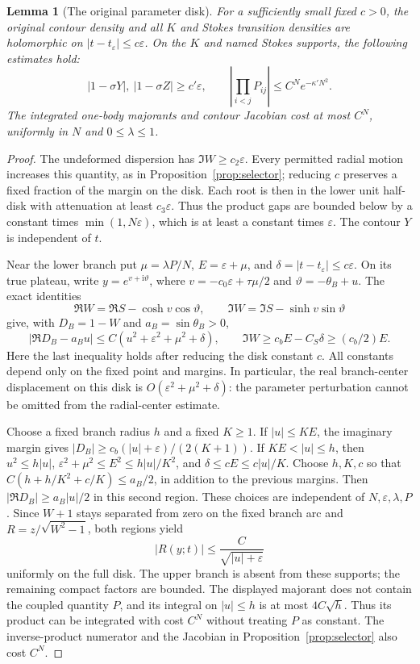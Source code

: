 \documentclass[11pt]{article}
\numberwithin{equation}{section}
\newtheorem{lemma}[theorem]{Lemma}
\theoremstyle{definition}
\newcommand{\ii}{\mathrm i}
\newcommand{\eps}{\varepsilon}
\newcommand{\se}{t_\varepsilon}
\begin{document}
\begin{lemma}[The original parameter disk]\label{lem:originaldisk}
For a sufficiently small fixed \(c>0\), the original contour
density and all \(K\) and Stokes transition densities are holomorphic
on \(|t-t_\eps|\le c\eps\). On the \(K\) and named Stokes
supports, the following estimates hold:
\[
 |1-\sigma Y|,\ |1-\sigma Z|\ge c'\eps,\qquad
 \left|\prod_{i<j}P_{ij}\right|\le C^Ne^{-\kappa' N^2}.
\]
The integrated one-body majorants and contour Jacobian cost
at most \(C^N\), uniformly in \(N\) and \(0\le\lambda\le1\).
\end{lemma}
\begin{proof}
The undeformed dispersion has \(\Im W\ge c_2\eps\).
Every permitted radial motion increases this quantity, as in
Proposition~\ref{prop:selector}; reducing \(c\) preserves a
fixed fraction of the margin on the disk. Each root is then
in the lower unit half-disk with attenuation at least \(c_3\eps\).
Thus the product gaps are bounded below by a constant times
\(\min(1,N\eps)\), which is at least a constant times \(\eps\).
The contour \(Y\) is independent of \(t\).

Near the lower branch put \(\mu=\lambda P/N\),
\(E=\eps+\mu\), and \(\delta=|t-\se|\le c\eps\).
On its true plateau, write
\(y=e^{v+\ii\vartheta}\), where
\(v=-c_0\eps+\tau \mu/2\) and \(\vartheta=-\theta_B+u\).
The exact identities
\[
 \Re W=\Re S-\cosh v\cos\vartheta,\qquad
 \Im W=\Im S-\sinh v\sin\vartheta
\]
give, with \(D_B=1-W\) and \(a_B=\sin\theta_B>0\),
\[
 |\Re D_B-a_Bu|
 \le C(u^2+\eps^2+\mu^2+\delta),\qquad
 \Im W\ge c_bE-C_S\delta\ge(c_b/2)E.
\]
Here the last inequality holds after reducing the disk constant
\(c\). All constants depend only on the fixed point and margins.
In particular, the real branch-center displacement on this disk is
\(O(\eps^2+\mu^2+\delta)\): the parameter perturbation cannot be
omitted from the radial-center estimate.

Choose a fixed branch radius \(h\) and a fixed \(K\ge1\).
If \(|u|\le KE\), the imaginary margin gives
\(|D_B|\ge c_b(|u|+\eps)/(2(K+1))\).
If \(KE<|u|\le h\), then
\(u^2\le h|u|\), \(\eps^2+\mu^2\le E^2\le h|u|/K^2\),
and \(\delta\le cE\le c|u|/K\).
Choose \(h,K,c\) so that
\(C(h+h/K^2+c/K)\le a_B/2\), in addition to the previous margins.
Then \(|\Re D_B|\ge a_B|u|/2\) in this second region.
These choices are independent of \(N,\eps,\lambda,P\).
Since \(W+1\) stays separated from zero on the fixed branch arc
and \(R=z/\sqrt{W^2-1}\), both regions yield
\[
 |R(y;t)|\le \frac{C}{\sqrt{|u|+\eps}}
\]
uniformly on the full disk. The upper branch is absent from
these supports; the remaining compact factors are bounded.
The displayed majorant does not contain the coupled quantity
\(P\), and its integral on \(|u|\le h\) is at most \(4C\sqrt h\).
Thus its product can be integrated with cost \(C^N\) without
treating \(P\) as constant. The inverse-product numerator
and the Jacobian in Proposition~\ref{prop:selector} also cost \(C^N\).


\end{proof}
\end{document}

